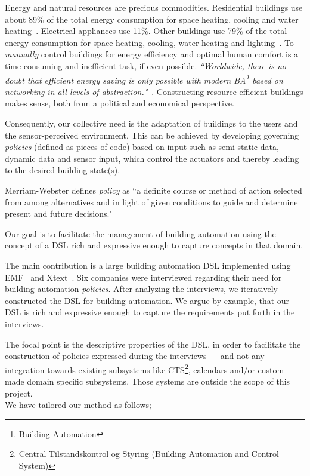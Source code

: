 Energy and natural resources are precious commodities. Residential buildings use about 89\% of the total energy consumption for space heating, cooling and water heating~\cite{janssen2004towards}. Electrical appliances use 11\%. Other buildings use 79\% of the total energy consumption for space heating, cooling, water heating and lighting~\cite{janssen2004towards}. To \textit{manually} control buildings for energy efficiency and optimal human comfort is a time-consuming and inefficient task, if even possible. \textit{``Worldwide, there is no doubt that efficient energy saving is only possible with modern BA\footnote{Building Automation} based on networking in all levels of abstraction."}~\cite{dietrich2010communication}. Constructing resource efficient buildings makes sense, both from a political and economical perspective. 

Consequently, our collective need is the adaptation of buildings to the users and the sensor-perceived environment. This can be achieved by developing governing \textit{policies} (defined as pieces of code) based on input such as semi-static data, dynamic data and sensor input, which control the actuators and thereby leading to the desired building state(s).

Merriam-Webster defines \textit{policy} as ``a definite course or method of action selected from among alternatives and in light of given conditions to guide and determine present and future decisions."

Our goal is to facilitate the management of building automation using the concept of a DSL rich and expressive enough to capture concepts in that domain.

The main contribution is a large building automation DSL implemented using EMF~\cite{emf} and Xtext~\cite{xtext}. Six companies were interviewed regarding their need for building automation \textit{policies}. After analyzing the interviews, we iteratively constructed the DSL for building automation. We argue by example, that our DSL is rich and expressive enough to capture the requirements put forth in the interviews. 

The focal point is the descriptive properties of the DSL, in order to facilitate the construction of policies expressed during the interviews --- and not any integration towards existing subsystems like CTS\footnote{Central Tilstandskontrol og Styring (Building Automation and Control System)}, calendars and/or custom made domain specific subsystems. Those systems are outside the scope of this project.
\newline\\
We have tailored our method as follows;

